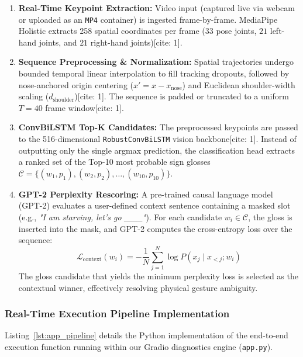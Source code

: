 \documentclass[12pt,a4paper]{article}
\begin{document}
\begin{enumerate}
    \item \textbf{Real-Time Keypoint Extraction:} Video input (captured live via webcam or uploaded as an \texttt{MP4} container) is ingested frame-by-frame. MediaPipe Holistic extracts 258 spatial coordinates per frame ($33$ pose joints, $21$ left-hand joints, and $21$ right-hand joints)[cite: 1].
    \item \textbf{Sequence Preprocessing \& Normalization:} Spatial trajectories undergo bounded temporal linear interpolation to fill tracking dropouts, followed by nose-anchored origin centering ($x' = x - x_{\text{nose}}$) and Euclidean shoulder-width scaling ($d_{\text{shoulder}}$)[cite: 1]. The sequence is padded or truncated to a uniform $T=40$ frame window[cite: 1].
    \item \textbf{ConvBiLSTM Top-K Candidates:} The preprocessed keypoints are passed to the 516-dimensional \texttt{RobustConvBiLSTM} vision backbone[cite: 1]. Instead of outputting only the single argmax prediction, the classification head extracts a ranked set of the Top-10 most probable sign glosses $\mathcal{C} = \{(w_1, p_1), (w_2, p_2), \dots, (w_{10}, p_{10})\}$.
    \item \textbf{GPT-2 Perplexity Rescoring:} A pre-trained causal language model (GPT-2) evaluates a user-defined context sentence containing a masked slot (e.g., \textit{"I am starving, let's go \_\_\_"}). For each candidate $w_i \in \mathcal{C}$, the gloss is inserted into the mask, and GPT-2 computes the cross-entropy loss over the sequence:
    \begin{equation}
        \mathcal{L}_{\text{context}}(w_i) = -\frac{1}{N}\sum_{j=1}^{N} \log P(x_j \mid x_{<j}; w_i)
    \end{equation}
    The gloss candidate that yields the minimum perplexity loss is selected as the contextual winner, effectively resolving physical gesture ambiguity.
\end{enumerate}

\subsubsection{Real-Time Execution Pipeline Implementation}
Listing~\ref{lst:app_pipeline} details the Python implementation of the end-to-end execution function running within our Gradio diagnostics engine (\texttt{app.py}).
\end{document}
